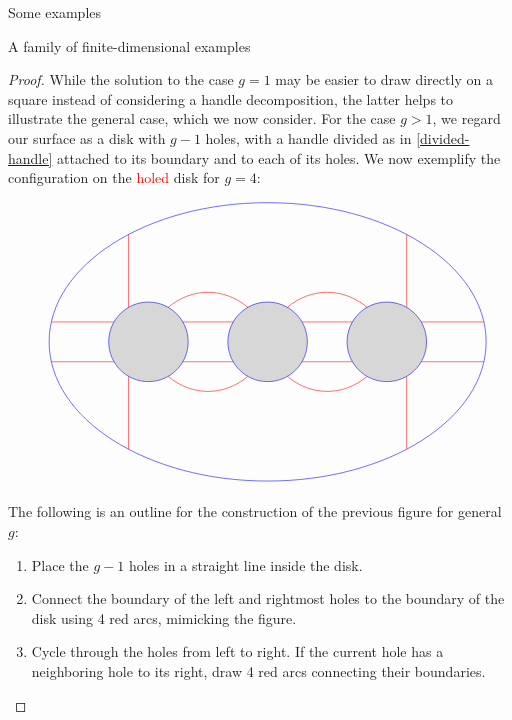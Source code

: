 \begin{chapter}{Some examples}
\begin{section}{A family of finite-dimensional examples}
\begin{proof}

While the solution to the case $g=1$ may be easier to draw directly on a square instead of considering a handle decomposition, the latter helps to illustrate the general case, which we now consider. For the case $g>1$, we regard our surface as a disk with $g-1$ holes, with a handle divided as in \ref{divided-handle} attached to its boundary and to each of its holes. We now exemplify the configuration on the \textcolor{red}{holed} disk for $g=4$:

\begin{figure}[h]
\[
\begin{tikzpicture}
\draw[red] (-5.44, 0.5) -- (-3.87, 0.5);
\draw[red] (-5.44, -0.5) -- (-3.87, -0.5);
\draw[red] (5.44, 0.5) -- (3.87, 0.5);
\draw[red] (5.44, -0.5) -- (3.87, -0.5);

\draw[red] (-3.5,0.87) -- (-3.5,2.7);
\draw[red] (-3.5,-0.87) -- (-3.5,-2.7);
\draw[red] (3.5,0.87) -- (3.5,2.7);
\draw[red] (3.5,-0.87) -- (3.5,-2.7);

\draw[red] (-2.137, 0.5) -- (-0.863, 0.5);
\draw[red] (-2.137, -0.5) -- (-0.863, -0.5);
\draw[red] (2.137, 0.5) -- (0.863, 0.5);
\draw[red] (2.137, -0.5) -- (0.863, -0.5);

\draw[red] (-2.5,0.87) to [bend left=40] (-0.5,0.87);
\draw[red] (2.5,0.87) to [bend right=40] (0.5,0.87);
\draw[red] (-2.5,-0.87) to [bend right=40] (-0.5,-0.87);
\draw[red] (2.5,-0.87) to [bend left=40] (0.5,-0.87);

\draw[blue] (0,0) ellipse (5.5cm and 3.5cm);
\draw[blue] (0,0) circle (1cm);
\draw[blue] (-3,0) circle (1cm);
\draw[blue] (3,0) circle (1cm);
\fill [black,opacity=.15] (-3,0) circle (1cm);
\fill [black,opacity=.15] (0,0) circle (1cm);
\fill [black,opacity=.15] (3,0) circle (1cm);
\end{tikzpicture}
\]
\end{figure}

The following is an outline for the construction of the previous figure for general $g$:
\begin{enumerate}
\item Place the $g-1$ holes in a straight line inside the disk.
\item Connect the boundary of the left and rightmost holes to the boundary of the disk using 4 red arcs, mimicking the figure.
\item Cycle through the holes from left to right. If the current hole has a neighboring hole to its right, draw 4 red arcs connecting their boundaries.
\end{enumerate}


\end{proof}
\end{section}
\end{chapter}
